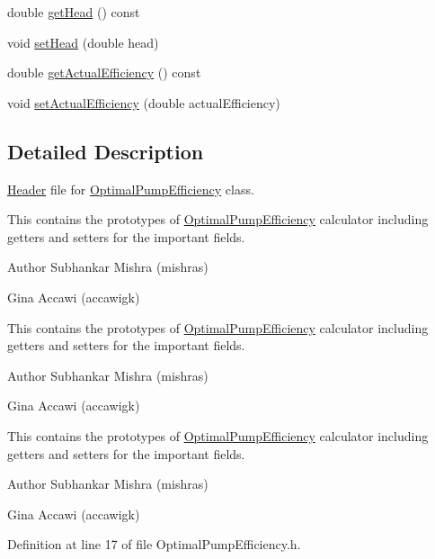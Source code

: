 \begin{DoxyCompactItemize}
\item 
double \hyperlink{class_optimal_pump_efficiency_af31fdb10aabc197ff7536c9bbe006573}{get\+Head} () const
\item 
void \hyperlink{class_optimal_pump_efficiency_ac317c900ec68797cf051977147ea33da}{set\+Head} (double head)
\item 
double \hyperlink{class_optimal_pump_efficiency_aa2ac8a7c61bc28f82e30cb44b9c21008}{get\+Actual\+Efficiency} () const
\item 
void \hyperlink{class_optimal_pump_efficiency_a539b20c53c7ba6a5983a60d74be4ac9e}{set\+Actual\+Efficiency} (double actual\+Efficiency)
\end{DoxyCompactItemize}


\subsection{Detailed Description}
\hyperlink{class_header}{Header} file for \hyperlink{class_optimal_pump_efficiency}{Optimal\+Pump\+Efficiency} class. 

This contains the prototypes of \hyperlink{class_optimal_pump_efficiency}{Optimal\+Pump\+Efficiency} calculator including getters and setters for the important fields.

\begin{DoxyAuthor}{Author}
Subhankar Mishra (mishras) 

Gina Accawi (accawigk) 
\end{DoxyAuthor}


This contains the prototypes of \hyperlink{class_optimal_pump_efficiency}{Optimal\+Pump\+Efficiency} calculator including getters and setters for the important fields.

\begin{DoxyAuthor}{Author}
Subhankar Mishra (mishras) 

Gina Accawi (accawigk) 
\end{DoxyAuthor}


This contains the prototypes of \hyperlink{class_optimal_pump_efficiency}{Optimal\+Pump\+Efficiency} calculator including getters and setters for the important fields.

\begin{DoxyAuthor}{Author}
Subhankar Mishra (mishras) 

Gina Accawi (accawigk) 
\end{DoxyAuthor}


Definition at line 17 of file Optimal\+Pump\+Efficiency.\+h.



